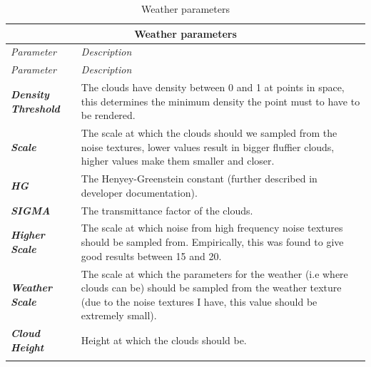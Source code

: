 \begin{center}
	\begin{longtable}{ | p{} | p{} | }
		
		\hline
		\multicolumn{2}{|c|}{\textbf{Weather parameters}}
		\\ \hline
		
		\emph{Parameter} & \emph{Description}
		\\ \hline \hline
		\endfirsthead %
		
		\hline
		\emph{Parameter} & \emph{Description}
		\\ \hline \hline
		\endhead %
	
		\hline
		\endfoot %
		
		\endlastfoot %
		
		\emph{\textbf{Density Threshold}}
		& The clouds have density between 0 and 1 at points in space, this determines the minimum density the point must to have to be rendered.
		\\ \hline
		
		\emph{\textbf{Scale}}
		& The scale at which the clouds should we sampled from the noise textures, lower values result in bigger fluffier clouds, higher values make them smaller and closer.
		\\ \hline
		
		\emph{\textbf{HG}}
		& The Henyey-Greenstein constant (further described in developer documentation).
		\\ \hline
		
		\emph{\textbf{SIGMA}}
		& The transmittance factor of the clouds.
		\\ \hline
		
		\emph{\textbf{Higher Scale}}
		& The scale at which noise from high frequency noise textures should be sampled from. Empirically, this was found to give good results between 15 and 20.
		\\ \hline
		
		\emph{\textbf{Weather Scale}}
		& The scale at which the parameters for the weather (i.e where clouds can be) should be sampled from the weather texture (due to the noise textures I have, this value should be extremely small).
		\\ \hline
		
		\emph{\textbf{Cloud Height}}
		& Height at which the clouds should be.
		\\ \hline
		
		\caption{Weather parameters}
		\label{tab:weather_params}		
	\end{longtable}
\end{center}
